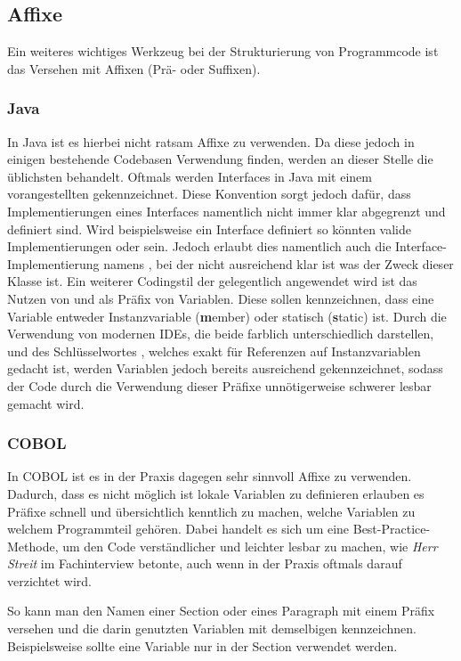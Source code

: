 \subsection*{Affixe} \label{affix}
Ein weiteres wichtiges Werkzeug bei der Strukturierung von Programmcode ist das Versehen mit Affixen (Prä- oder Suffixen).
\subsubsection*{Java}
In Java ist es hierbei nicht ratsam Affixe zu verwenden. Da diese jedoch in einigen bestehende Codebasen Verwendung finden, werden an dieser Stelle die üblichsten behandelt.
Oftmals werden Interfaces in Java mit einem vorangestellten  gekennzeichnet. Diese Konvention sorgt jedoch dafür, dass Implementierungen eines Interfaces namentlich nicht immer klar abgegrenzt und definiert sind. Wird beispielsweise ein Interface  definiert so könnten valide Implementierungen  oder   sein. Jedoch erlaubt dies namentlich auch die Interface-Implementierung namens , bei der nicht ausreichend klar ist was der Zweck dieser Klasse ist.
Ein weiterer Codingstil der gelegentlich angewendet wird ist das Nutzen von  und  als Präfix von Variablen. Diese sollen kennzeichnen, dass eine Variable entweder Instanzvariable (\textbf{m}ember) oder statisch (\textbf{s}tatic) ist. Durch die Verwendung von modernen IDEs, die beide farblich unterschiedlich darstellen, und des Schlüsselwortes , welches exakt für Referenzen auf Instanzvariablen gedacht ist, werden Variablen jedoch bereits ausreichend gekennzeichnet, sodass der Code durch die Verwendung dieser Präfixe unnötigerweise schwerer lesbar gemacht wird.

\subsubsection*{COBOL}\label{affixCOBOL}
In COBOL ist es in der Praxis dagegen sehr sinnvoll Affixe zu verwenden. Dadurch, dass es nicht möglich ist lokale Variablen zu definieren erlauben es Präfixe schnell und übersichtlich kenntlich zu machen, welche Variablen zu welchem Programmteil gehören. Dabei handelt es sich um eine Best-Practice-Methode, um den Code verständlicher und leichter lesbar zu machen, wie \textit{Herr Streit} im Fachinterview betonte, auch wenn in der Praxis oftmals darauf verzichtet wird.

So kann man den Namen einer Section oder eines Paragraph mit einem Präfix versehen und die darin genutzten Variablen mit demselbigen kennzeichnen. Beispielsweise sollte eine Variable  nur in der Section  verwendet werden. 

